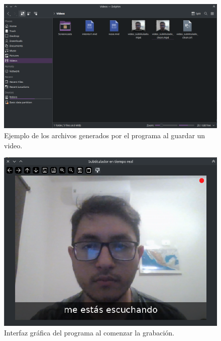 \documentclass[conference]{IEEEtran}
\begin{document}
\begin{figure}[ht]
    \centering
    \includegraphics[width=\columnwidth]{images/generated-images.png}
    \caption{Ejemplo de los archivos generados por el programa al guardar un video.}
    \label{fig:generated-images}
\end{figure}

\begin{figure}[ht]
    \centering
    \includegraphics[width=\columnwidth]{images/rec-UI.png}
    \caption{Interfaz gráfica del programa al comenzar la grabación.}
    \label{fig:rec-UI}
\end{figure}
\end{document}

